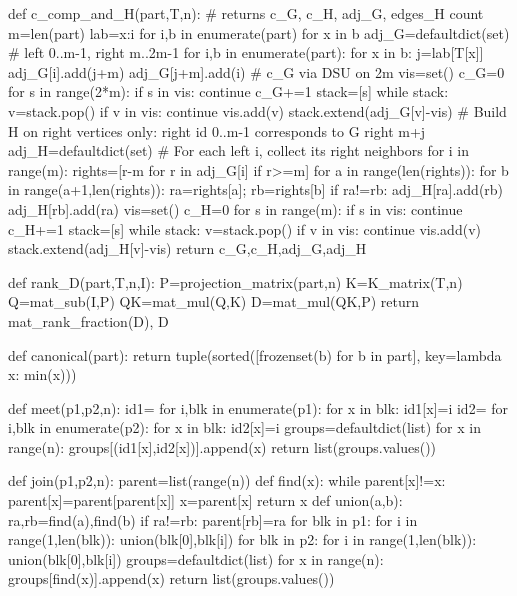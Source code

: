 def c_comp_and_H(part,T,n):
    # returns c_G, c_H, adj_G, edges_H count
    m=len(part)
    lab={x:i for i,b in enumerate(part) for x in b}
    adj_G=defaultdict(set)
    # left 0..m-1, right m..2m-1
    for i,b in enumerate(part):
        for x in b:
            j=lab[T[x]]
            adj_G[i].add(j+m)
            adj_G[j+m].add(i)
    # c_G via DSU on 2m
    vis=set()
    c_G=0
    for s in range(2*m):
        if s in vis:
            continue
        c_G+=1
        stack=[s]
        while stack:
            v=stack.pop()
            if v in vis:
                continue
            vis.add(v)
            stack.extend(adj_G[v]-vis)
    # Build H on right vertices only: right id 0..m-1 corresponds to G right m+j
    adj_H=defaultdict(set)
    # For each left i, collect its right neighbors
    for i in range(m):
        rights=[r-m for r in adj_G[i] if r>=m]
        for a in range(len(rights)):
            for b in range(a+1,len(rights)):
                ra=rights[a]; rb=rights[b]
                if ra!=rb:
                    adj_H[ra].add(rb)
                    adj_H[rb].add(ra)
    vis=set()
    c_H=0
    for s in range(m):
        if s in vis:
            continue
        c_H+=1
        stack=[s]
        while stack:
            v=stack.pop()
            if v in vis:
                continue
            vis.add(v)
            stack.extend(adj_H[v]-vis)
    return c_G,c_H,adj_G,adj_H

def rank_D(part,T,n,I):
    P=projection_matrix(part,n)
    K=K_matrix(T,n)
    Q=mat_sub(I,P)
    QK=mat_mul(Q,K)
    D=mat_mul(QK,P)
    return mat_rank_fraction(D), D

def canonical(part):
    return tuple(sorted([frozenset(b) for b in part], key=lambda x: min(x)))

def meet(p1,p2,n):
    id1={}
    for i,blk in enumerate(p1):
        for x in blk:
            id1[x]=i
    id2={}
    for i,blk in enumerate(p2):
        for x in blk:
            id2[x]=i
    groups=defaultdict(list)
    for x in range(n):
        groups[(id1[x],id2[x])].append(x)
    return list(groups.values())

def join(p1,p2,n):
    parent=list(range(n))
    def find(x):
        while parent[x]!=x:
            parent[x]=parent[parent[x]]
            x=parent[x]
        return x
    def union(a,b):
        ra,rb=find(a),find(b)
        if ra!=rb:
            parent[rb]=ra
    for blk in p1:
        for i in range(1,len(blk)):
            union(blk[0],blk[i])
    for blk in p2:
        for i in range(1,len(blk)):
            union(blk[0],blk[i])
    groups=defaultdict(list)
    for x in range(n):
        groups[find(x)].append(x)
    return list(groups.values())

